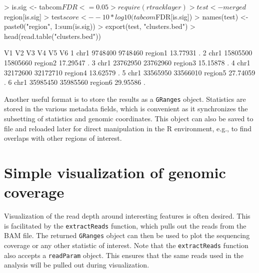 \documentclass[12pt]{report}
\renewenvironment{Schunk}{\vspace{0pt}}{\vspace{0pt}}
\newcommand{\code}[1]{{\small\texttt{#1}}}
\begin{document}
\begin{Schunk}
\begin{Sinput}
> is.sig <- tabcom$FDR <= 0.05
> require(rtracklayer)
> test <- merged$region[is.sig]
> test$score <- -10*log10(tabcom$FDR[is.sig])
> names(test) <- paste0("region", 1:sum(is.sig))
> export(test, "clusters.bed")
> head(read.table("clusters.bed"))
\end{Sinput}
\begin{Soutput}
    V1       V2       V3      V4       V5 V6
1 chr1  9748400  9748460 region1 13.77931  .
2 chr1 15805500 15805660 region2 17.29547  .
3 chr1 23762950 23762960 region3 15.15878  .
4 chr1 32172600 32172710 region4 13.62579  .
5 chr1 33565950 33566010 region5 27.74059  .
6 chr1 35985450 35985560 region6 29.95586  .
\end{Soutput}
\end{Schunk}

Another useful format is to store the results as a \code{GRanges} object.
Statistics are stored in the various metadata fields, which is convenient as it synchronizes the subsetting of statistics and genomic coordinates.
This object can also be saved to file and reloaded later for direct manipulation in the R environment, e.g., to find overlaps with other regions of interest.

\begin{Schunk}
\end{Schunk}

\section{Simple visualization of genomic coverage}
Visualization of the read depth around interesting features is often desired.
This is facilitated by the \code{extractReads} function, which pulls out the reads from the BAM file.
The returned \code{GRanges} object can then be used to plot the sequencing coverage or any other statistic of interest.
Note that the \code{extractReads} function also accepts a \code{readParam} object.
This ensures that the same reads used in the analysis will be pulled out during visualization.
\end{document}
